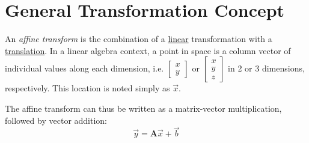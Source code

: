 \section{General Transformation Concept}

An \emph{affine transform} is the combination of a \underline{linear} transformation with a \underline{translation}. In a linear algebra context, a point in space is a column vector of individual values along each dimension, i.e. $\left[\begin{matrix}x\\y\end{matrix}\right]$ or $\left[\begin{matrix}x\\y\\z\end{matrix}\right]$ in 2 or 3 dimensions, respectively. This location is noted simply as $\vec{x}$.

The affine transform can thus be written as a matrix-vector multiplication, followed by vector addition:
\begin{equation}
\vec{y} = \mathbf{A}\vec{x} + \vec{b}
\end{equation}

